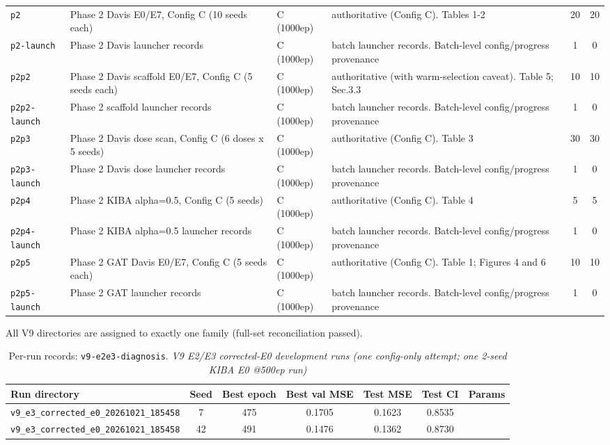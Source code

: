 \begin{table}[!h]
\begin{tabular}{p{2.6cm}p{4.6cm}p{2.0cm}p{3.4cm}cc}
\texttt{p2} & Phase 2 Davis E0/E7, Config C (10 seeds each) & C (1000ep) & authoritative (Config C). Tables 1-2 & 20 & 20 \\
\texttt{p2-launch} & Phase 2 Davis launcher records & C (1000ep) & batch launcher records. Batch-level config/progress provenance & 1 & 0 \\
\texttt{p2p2} & Phase 2 Davis scaffold E0/E7, Config C (5 seeds each) & C (1000ep) & authoritative (with warm-selection caveat). Table 5; Sec.3.3 & 10 & 10 \\
\texttt{p2p2-launch} & Phase 2 scaffold launcher records & C (1000ep) & batch launcher records. Batch-level config/progress provenance & 1 & 0 \\
\texttt{p2p3} & Phase 2 Davis dose scan, Config C (6 doses x 5 seeds) & C (1000ep) & authoritative (Config C). Table 3 & 30 & 30 \\
\texttt{p2p3-launch} & Phase 2 Davis dose launcher records & C (1000ep) & batch launcher records. Batch-level config/progress provenance & 1 & 0 \\
\texttt{p2p4} & Phase 2 KIBA alpha=0.5, Config C (5 seeds) & C (1000ep) & authoritative (Config C). Table 4 & 5 & 5 \\
\texttt{p2p4-launch} & Phase 2 KIBA alpha=0.5 launcher records & C (1000ep) & batch launcher records. Batch-level config/progress provenance & 1 & 0 \\
\texttt{p2p5} & Phase 2 GAT Davis E0/E7, Config C (5 seeds each) & C (1000ep) & authoritative (Config C). Table 1; Figures 4 and 6 & 10 & 10 \\
\texttt{p2p5-launch} & Phase 2 GAT launcher records & C (1000ep) & batch launcher records. Batch-level config/progress provenance & 1 & 0 \\
\bottomrule
\end{tabular}
\par\smallskip\footnotesize All V9 directories are assigned to exactly one family (full-set reconciliation passed).
\end{table}

\begin{table}[!h]
\centering\scriptsize
\caption{Per-run records: \texttt{v9-e2e3-diagnosis}. \textit{V9 E2/E3 corrected-E0 development runs (one config-only attempt; one 2-seed KIBA E0 @500ep run)}}
\label{tab:v9_runs_v9_e2e3_diagnosis}
\begin{tabular}{p{4.8cm}cccccc}
\toprule
Run directory & Seed & Best epoch & Best val MSE & Test MSE & Test CI & Params \\
\midrule
\texttt{v9\_\allowbreak{}e3\_\allowbreak{}corrected\_\allowbreak{}e0\_\allowbreak{}20261021\_\allowbreak{}185458} & 7 & 475 & 0.1705 & 0.1623 & 0.8535 &  \\
\texttt{v9\_\allowbreak{}e3\_\allowbreak{}corrected\_\allowbreak{}e0\_\allowbreak{}20261021\_\allowbreak{}185458} & 42 & 491 & 0.1476 & 0.1362 & 0.8730 &  \\
\bottomrule
\end{tabular}
\end{table}

